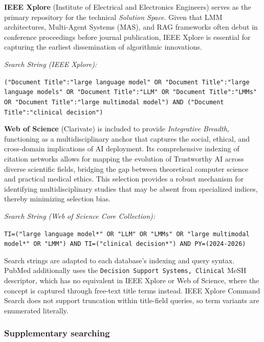 \documentclass[review,12pt]{elsarticle}
\begin{document}
\textbf{IEEE Xplore} (Institute of Electrical and Electronics Engineers) serves as the primary repository for the technical \textit{Solution Space}. Given that LMM architectures, Multi-Agent Systems (MAS), and RAG frameworks often debut in conference proceedings before journal publication, IEEE Xplore is essential for capturing the earliest dissemination of algorithmic innovations.

\textit{Search String (IEEE Xplore):}
\begin{center}
\texttt{("Document Title":"large language model" OR "Document Title":"large language models" OR "Document Title":"LLM" OR "Document Title":"LMMs" OR "Document Title":"large multimodal model") AND ("Document Title":"clinical decision")}
\end{center}

\textbf{Web of Science} (Clarivate) is included to provide \textit{Integrative Breadth}, functioning as a multidisciplinary anchor that captures the social, ethical, and cross-domain implications of AI deployment. Its comprehensive indexing of citation networks allows for mapping the evolution of Trustworthy AI across diverse scientific fields, bridging the gap between theoretical computer science and practical medical ethics. This selection provides a robust mechanism for identifying multidisciplinary studies that may be absent from specialized indices, thereby minimizing selection bias.

\textit{Search String (Web of Science Core Collection):}
\begin{center}
\texttt{TI=("large language model*" OR "LLM" OR "LMMs" OR "large multimodal model*" OR "LMM") AND TI=("clinical decision*") AND PY=(2024-2026)}
\end{center}

 Search strings are adapted to each database's indexing and query syntax. PubMed additionally uses the \texttt{Decision Support Systems, Clinical} MeSH descriptor, which has no equivalent in IEEE Xplore or Web of Science, where the concept is captured through free-text title terms instead. IEEE Xplore Command Search does not support truncation within title-field queries, so term variants are enumerated literally.

\subsubsection{Supplementary searching}
\end{document}
